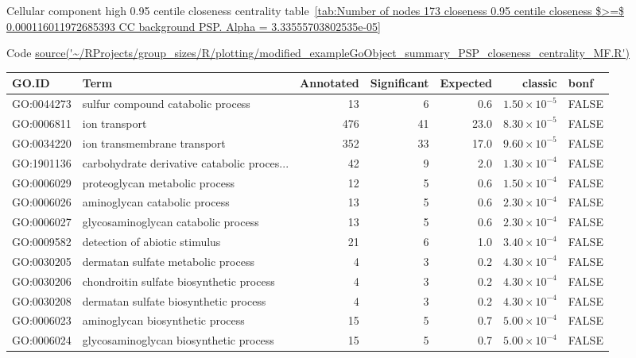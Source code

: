 Cellular component high 0.95 centile closeness centrality table~\ref{tab:Number of nodes 173 closeness 0.95 centile  closeness $>=$ 0.000116011972685393 CC background PSP. Alpha = 3.33555703802535e-05}


Code \url{source('~/RProjects/group_sizes/R/plotting/modified_exampleGoObject_summary_PSP_closeness_centrality_MF.R')}
\begin{table}[ht]
\centering
\begin{adjustbox}{max width=\textwidth}
\begin{tabular}{llrrrrl}
  \hline
GO.ID & Term & Annotated & Significant & Expected & classic & bonf \\ 
  \hline
GO:0044273 & sulfur compound catabolic process & 13 & 6 & 0.6 & $1.50 \times 10^{-5}$ & FALSE \\ 
  GO:0006811 & ion transport & 476 & 41 & 23.0 & $8.30 \times 10^{-5}$ & FALSE \\ 
  GO:0034220 & ion transmembrane transport & 352 & 33 & 17.0 & $9.60 \times 10^{-5}$ & FALSE \\ 
  GO:1901136 & carbohydrate derivative catabolic proces... & 42 & 9 & 2.0 & $1.30 \times 10^{-4}$ & FALSE \\ 
  GO:0006029 & proteoglycan metabolic process & 12 & 5 & 0.6 & $1.50 \times 10^{-4}$ & FALSE \\ 
  GO:0006026 & aminoglycan catabolic process & 13 & 5 & 0.6 & $2.30 \times 10^{-4}$ & FALSE \\ 
  GO:0006027 & glycosaminoglycan catabolic process & 13 & 5 & 0.6 & $2.30 \times 10^{-4}$ & FALSE \\ 
  GO:0009582 & detection of abiotic stimulus & 21 & 6 & 1.0 & $3.40 \times 10^{-4}$ & FALSE \\ 
  GO:0030205 & dermatan sulfate metabolic process & 4 & 3 & 0.2 & $4.30 \times 10^{-4}$ & FALSE \\ 
  GO:0030206 & chondroitin sulfate biosynthetic process & 4 & 3 & 0.2 & $4.30 \times 10^{-4}$ & FALSE \\ 
  GO:0030208 & dermatan sulfate biosynthetic process & 4 & 3 & 0.2 & $4.30 \times 10^{-4}$ & FALSE \\ 
  GO:0006023 & aminoglycan biosynthetic process & 15 & 5 & 0.7 & $5.00 \times 10^{-4}$ & FALSE \\ 
  GO:0006024 & glycosaminoglycan biosynthetic process & 15 & 5 & 0.7 & $5.00 \times 10^{-4}$ & FALSE \\ 

\end{tabular}
\end{adjustbox}
\end{table}
